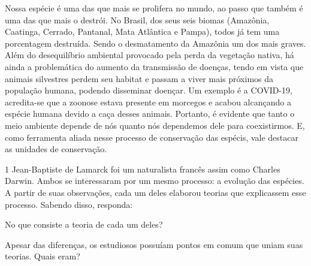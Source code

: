 {Nossa espécie é uma das que mais se prolifera no mundo, ao passo que
também é uma das que mais o destrói. No Brasil, dos seus seis biomas
(Amazônia, Caatinga, Cerrado, Pantanal, Mata Atlântica e Pampa), todos
já tem uma porcentagem destruída. Sendo o desmatamento da Amazônia um
dos mais graves. Além do desequilíbrio ambiental provocado pela perda da
vegetação nativa, há ainda a problemática do aumento da transmissão de
doenças, tendo em vista que animais silvestres perdem seu habitat e
passam a viver mais próximos da população humana, podendo disseminar
doençar. Um exemplo é a COVID-19, acredita-se que a zoonose estava
presente em morcegos e acabou alcançando a espécie humana devido a caça
desses animais. Portanto, é evidente que tanto o meio ambiente depende
de nós quanto nós dependemos dele para coexistirmos. E, como ferramenta
aliada nesse processo de conservação das espécis, vale destacar as
unidades de conservação.}

\num{1} Jean-Baptiste de Lamarck foi um naturalista francês assim como Charles
  Darwin. Ambos se interessaram por um mesmo processo: a evolução das
  espécies. A partir de suas observações, cada um deles elaborou teorias
  que explicassem esse processo. Sabendo disso, responda:

\begin{escolha}
\item No que consiste a teoria de cada um deles?



\item Apesar das diferenças, os estudiosos possuíam pontos em comum que uniam suas teorias. Quais eram?


\end{escolha}

